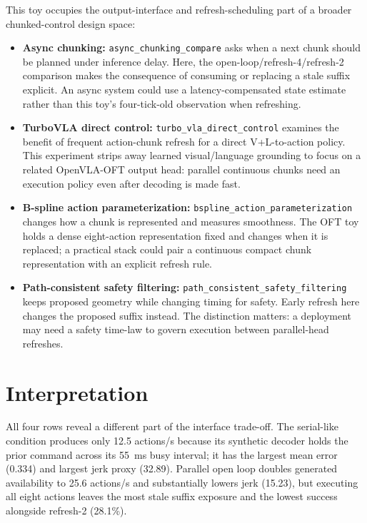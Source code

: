 \documentclass[11pt]{article}
\begin{document}
This toy occupies the output-interface and refresh-scheduling part of a broader chunked-control design space:
\begin{itemize}[leftmargin=1.5em]
  \item \textbf{Async chunking:} \texttt{async\_chunking\_compare} asks when a next chunk should be planned under inference delay. Here, the open-loop/refresh-4/refresh-2 comparison makes the consequence of consuming or replacing a stale suffix explicit. An async system could use a latency-compensated state estimate rather than this toy's four-tick-old observation when refreshing.
  \item \textbf{TurboVLA direct control:} \texttt{turbo\_vla\_direct\_control} examines the benefit of frequent action-chunk refresh for a direct V+L-to-action policy. This experiment strips away learned visual/language grounding to focus on a related OpenVLA-OFT output head: parallel continuous chunks need an execution policy even after decoding is made fast.
  \item \textbf{B-spline action parameterization:} \texttt{bspline\_action\_parameterization} changes how a chunk is represented and measures smoothness. The OFT toy holds a dense eight-action representation fixed and changes when it is replaced; a practical stack could pair a continuous compact chunk representation with an explicit refresh rule.
  \item \textbf{Path-consistent safety filtering:} \texttt{path\_consistent\_safety\_filtering} keeps proposed geometry while changing timing for safety. Early refresh here changes the proposed suffix instead. The distinction matters: a deployment may need a safety time-law to govern execution between parallel-head refreshes.
\end{itemize}

\section{Interpretation}

All four rows reveal a different part of the interface trade-off. The serial-like condition produces only 12.5 actions/s because its synthetic decoder holds the prior command across its 55~ms busy interval; it has the largest mean error (0.334) and largest jerk proxy (32.89). Parallel open loop doubles generated availability to 25.6 actions/s and substantially lowers jerk (15.23), but executing all eight actions leaves the most stale suffix exposure and the lowest success alongside refresh-2 (28.1\%).
\end{document}
